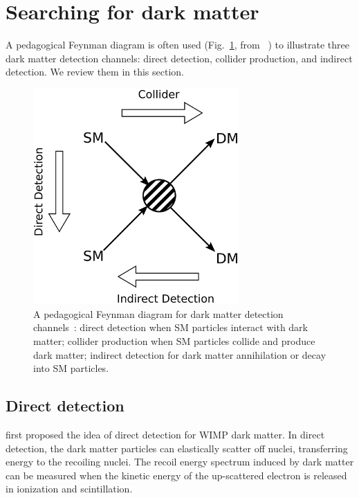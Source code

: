 \documentclass[doublespace,nopageskip]{VTthesis} %
\begin{document}
\section{Searching for dark matter}

A pedagogical Feynman diagram is often used (Fig.~\ref{fig:dm_search}, from ~\citet{2019FrP.....7...75G}) to illustrate three dark matter detection channels: direct detection, collider production, and indirect detection. We review them in this section.

\begin{figure}[htb]
    \centering
    \includegraphics[width=0.7\textwidth]{Figures/Intro/dm_diagram.jpg}
    \caption{A pedagogical Feynman diagram for dark matter detection channels~\cite{2019FrP.....7...75G}: direct detection when SM particles interact with dark matter; collider production when SM particles collide and produce dark matter; indirect detection for dark matter annihilation or decay into SM particles.}
    \label{fig:dm_search}
\end{figure}

\subsection{Direct detection}

\citet{1985PhRvD..31.3059G} first proposed the idea of direct detection for WIMP dark matter. In direct detection, the dark matter particles can elastically scatter off nuclei, transferring energy to the recoiling nuclei. The recoil energy spectrum induced by dark matter can be measured when the kinetic energy of the up-scattered electron is released in ionization and scintillation. 
\end{document}
